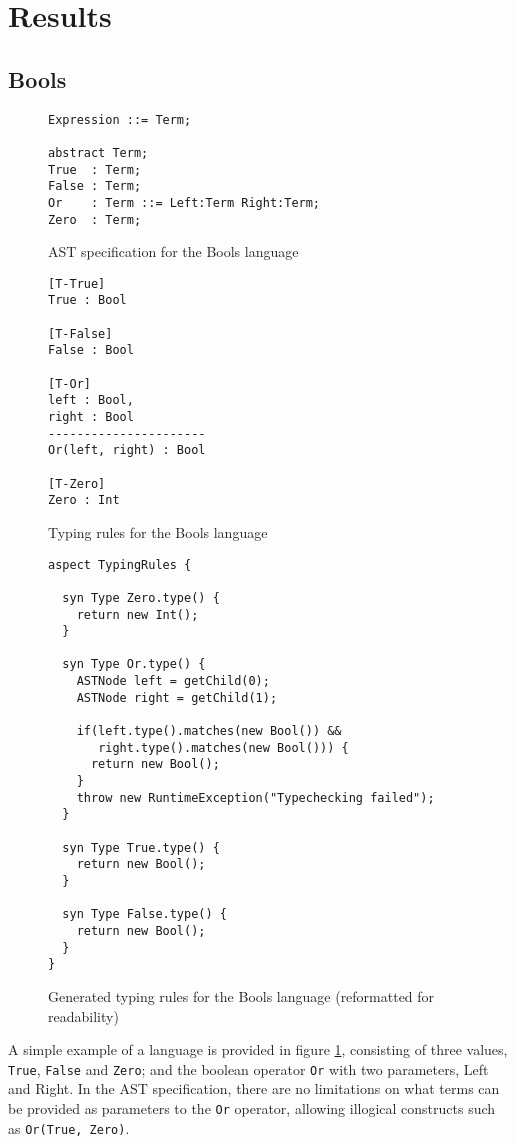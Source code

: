 \documentclass[nofilelist]{cslthse-msc}
\begin{document}
\section{Results} %
\subsection{Bools}

\begin{figure}[h]
\begin{lstlisting}[]
Expression ::= Term;

abstract Term;
True  : Term;
False : Term;
Or    : Term ::= Left:Term Right:Term;
Zero  : Term;
\end{lstlisting}
  \caption{AST specification for the Bools language}
  \label{boolsast}
\end{figure}
\begin{figure}[h]
\begin{lstlisting}[]
[T-True]
True : Bool

[T-False]
False : Bool

[T-Or]
left : Bool,
right : Bool
----------------------
Or(left, right) : Bool

[T-Zero]
Zero : Int
\end{lstlisting}
  \caption{Typing rules for the Bools language}
  \label{boolstr}
\end{figure}

\begin{figure}[h]
\begin{lstlisting}[language=jrag] 
aspect TypingRules {

  syn Type Zero.type() {
    return new Int();
  }

  syn Type Or.type() {
    ASTNode left = getChild(0);
    ASTNode right = getChild(1);

    if(left.type().matches(new Bool()) &&
       right.type().matches(new Bool())) {
      return new Bool();
    }
    throw new RuntimeException("Typechecking failed");
  }

  syn Type True.type() {
    return new Bool();
  }

  syn Type False.type() {
    return new Bool();
  }
}
\end{lstlisting}
  \caption{Generated typing rules for the Bools language (reformatted for readability)}
  \label{boolstrgen}
\end{figure}
A simple example of a language is provided in figure \ref{boolsast}, consisting of three values, \verb|True|, \verb|False| and \verb|Zero|; and the boolean operator \verb|Or| with two parameters, Left and Right.
In the AST specification, there are no limitations on what terms can be provided as parameters to the \verb|Or| operator, allowing illogical constructs such as \verb|Or(True, Zero)|.
\end{document}

